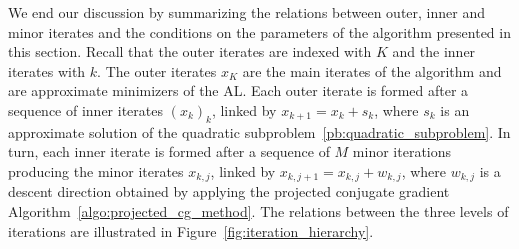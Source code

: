 \documentclass{article}
\numberwithin{equation}{section}
\theoremstyle{plain}
\begin{document}
We end our discussion by summarizing the relations between outer, inner and minor iterates and the conditions on the parameters of the algorithm presented in this section. Recall that the outer iterates are indexed with $K$ and the inner iterates with $k$.
The outer iterates $x_K$ are the main iterates of the algorithm and are approximate minimizers of the AL. Each outer iterate is formed after a sequence of inner iterates $(x_k)_k$, linked by $x_{k+1}=x_k+s_k$, where $s_k$ is an approximate solution of the quadratic subproblem~\eqref{pb:quadratic_subproblem}. In turn, each inner iterate is formed after a sequence of $M$ minor iterations producing the minor iterates $x_{k,j}$, linked by $x_{k,j+1}=x_{k,j}+w_{k,j}$, where $w_{k,j}$ is a descent direction obtained by applying the projected conjugate gradient Algorithm~\ref{algo:projected_cg_method}. 
The relations between the three levels of iterations are illustrated in Figure~\ref{fig:iteration_hierarchy}.
\end{document}
